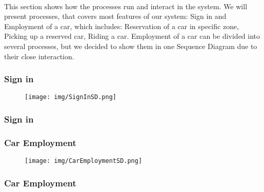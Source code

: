 	
		\paragraph{} This section shows how the processes run and interact in the system. 
		We will present processes, that covers most features of our system: Sign in and Employment of a car, which includes: Reservation of a car in specific zone, Picking up a reserved car, Riding a car. Employment of a car can be divided into several processes, but we decided to show them in one Sequence Diagram due to their close interaction.    

	\subsubsection{Sign in}	
		\begin{figure}[h]
			\texttt{[image: img/SignInSD.png]}
		\end{figure}
		
		\paragraph{}
			
	\subsubsection{Sign in}
	
	\subsubsection{Car Employment}	
		\begin{figure}[h]
			\texttt{[image: img/CarEmploymentSD.png]}
		\end{figure}
		
		\paragraph{}
		
	\subsubsection{Car Employment}
